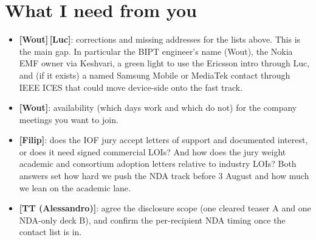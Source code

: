 \documentclass[11pt,a4paper]{article}
\newcommand{\owner}[1]{\textbf{[#1]}}
\begin{document}
\section{What I need from you}
\begin{itemize}
  \item \owner{Wout}\,\owner{Luc}: corrections and missing addresses for the lists above. This is the main gap. In particular the BIPT engineer's name (Wout), the Nokia EMF owner via Keshvari, a green light to use the Ericsson intro through Luc, and (if it exists) a named Samsung Mobile or MediaTek contact through IEEE ICES that could move device-side onto the fast track.
  \item \owner{Wout}: availability (which days work and which do not) for the company meetings you want to join.
  \item \owner{Filip}: does the IOF jury accept letters of support and documented interest, or does it need signed commercial LOIs? And how does the jury weight academic and consortium adoption letters relative to industry LOIs? Both answers set how hard we push the NDA track before 3 August and how much we lean on the academic lane.
  \item \owner{TT (Alessandro)}: agree the disclosure scope (one cleared teaser A and one NDA-only deck B), and confirm the per-recipient NDA timing once the contact list is in.
\end{itemize}
\end{document}
